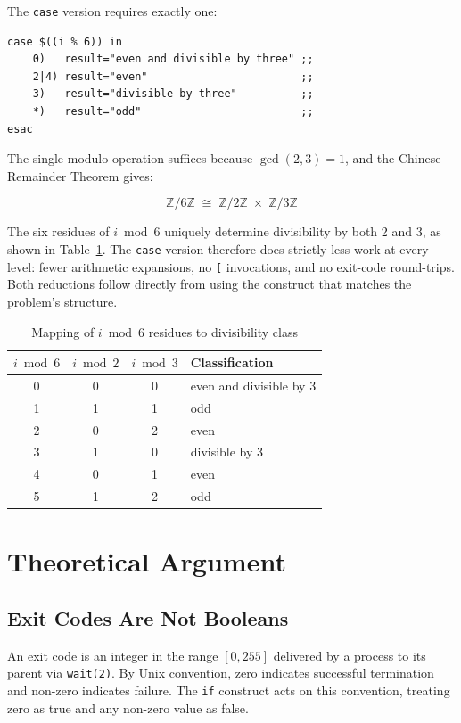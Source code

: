 \documentclass[11pt,a4paper]{article}
\begin{document}
The \texttt{case} version requires exactly one:

\begin{lstlisting}[numbers=none,frame=none,aboveskip=2pt,belowskip=2pt]
case $((i % 6)) in
    0)   result="even and divisible by three" ;;
    2|4) result="even"                        ;;
    3)   result="divisible by three"          ;;
    *)   result="odd"                         ;;
esac
\end{lstlisting}

The single modulo operation suffices because $\gcd(2,3) = 1$, and
the Chinese Remainder Theorem gives:

\[
\mathbb{Z}/6\mathbb{Z} \;\cong\;
\mathbb{Z}/2\mathbb{Z} \;\times\; \mathbb{Z}/3\mathbb{Z}
\]

The six residues of $i \bmod 6$ uniquely determine divisibility by
both 2 and 3, as shown in Table~\ref{tab:residues}.
The \texttt{case} version therefore does strictly less work at
every level: fewer arithmetic expansions, no \texttt{[} invocations,
and no exit-code round-trips.
Both reductions follow directly from using the construct that matches
the problem's structure.

\begin{table}[H]
\centering
\caption{Mapping of $i \bmod 6$ residues to divisibility class}
\label{tab:residues}
\small
\begin{tabular}{@{}cccl@{}}
\toprule
$i \bmod 6$ & $i \bmod 2$ & $i \bmod 3$ & Classification \\
\midrule
0 & 0 & 0 & even and divisible by 3 \\
1 & 1 & 1 & odd \\
2 & 0 & 2 & even \\
3 & 1 & 0 & divisible by 3 \\
4 & 0 & 1 & even \\
5 & 1 & 2 & odd \\
\bottomrule
\end{tabular}
\end{table}

\section{Theoretical Argument}

\subsection{Exit Codes Are Not Booleans}

An exit code is an integer in the range $[0, 255]$ delivered by a
process to its parent via \texttt{wait(2)}.
By Unix convention, zero indicates successful termination and
non-zero indicates failure.
The \texttt{if} construct acts on this convention, treating zero
as true and any non-zero value as false.
\end{document}
